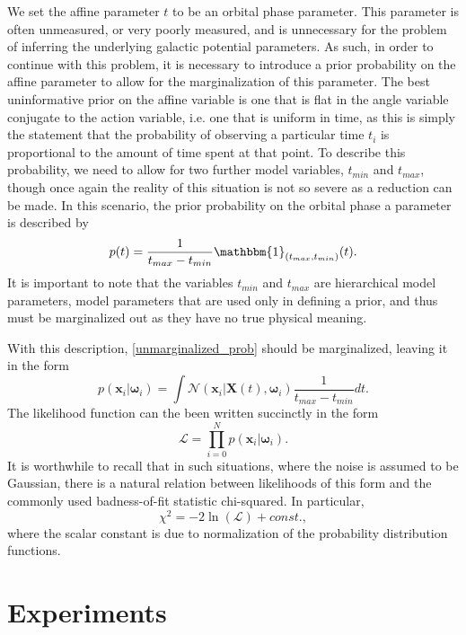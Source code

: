 \documentclass[12pt,preprint]{aastex}
\newcommand{\mtensor}[1]{\boldsymbol{#1}}
\newcommand{\mvector}[1]{\mtensor{#1}}
\newcommand{\vx}{\mvector{x}}
\newcommand{\vX}{\mvector{X}}
\newcommand{\vomega}{\mvector{\omega}}
\newcommand{\like}{\mathscr{L}}
\newcommand{\normal}{\mathscr{N}}
\begin{document}
We set the affine parameter $t$ to be an orbital phase parameter. This parameter is often unmeasured, or very poorly measured, and is unnecessary for the problem of inferring the underlying galactic potential parameters. As such, in order to continue with this problem, it is necessary to introduce a prior probability on the affine parameter to allow for the marginalization of this parameter. The best uninformative prior on the affine variable is one that is flat in the angle variable conjugate to the action variable, i.e. one that is uniform in time, as this is simply the statement that the probability of observing a particular time $t_i$ is proportional to the amount of time spent at that point. To describe this probability, we need to allow for two further model variables, $t_{min}$ and $t_{max}$, though once again the reality of this situation is not so severe as a reduction can be made. In this scenario, the prior probability on the orbital phase a parameter is described by
\begin{equation}
p(t) = \frac{1}{t_{max} - t_{min}}\mathbbm{1}_{(t_{max},t_{min})}(t).
\end{equation}
It is important to note that the variables $t_{min}$ and $t_{max}$ are hierarchical model parameters, model parameters that are used only in defining a prior, and thus must be marginalized out as they have no true physical meaning.

With this description, \eqref{unmarginalized_prob} should be marginalized, leaving it in the form
\begin{equation}
p(\vx_i | \vomega_i) = \int \normal(\vx_i|\vX(t), \vomega_i)\frac{1}{t_{max} - t_{min}}dt . 
\end{equation}
The likelihood function can the been written succinctly in the form 
\begin{equation}
\like = \prod_{i=0}^{N}p(\vx_i | \vomega_i).
\end{equation}
It is worthwhile to recall that in such situations, where the noise is assumed to be Gaussian, there is a natural relation between likelihoods of this form and the commonly used badness-of-fit statistic chi-squared. In particular, 
\begin{equation}
\chi^2 = -2 \ln(\like) + const. ,
\end{equation}
where the scalar constant is due to normalization of the probability distribution functions.

\section{Experiments}
\end{document}
